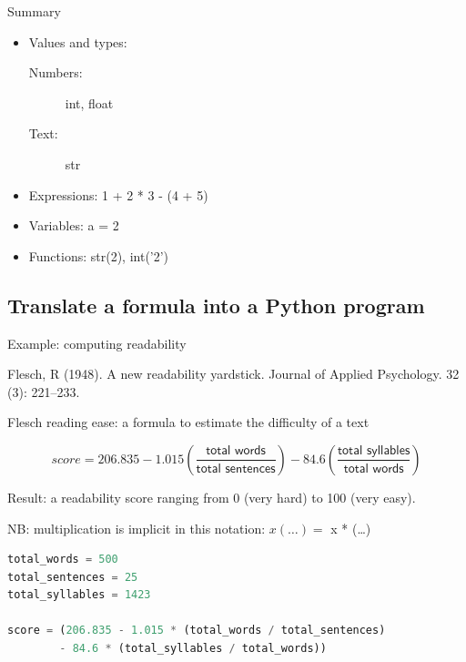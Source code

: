 \documentclass[aspectratio=169,usenames,dvipsnames]{beamer}
\begin{document}
\begin{frame}{Summary}
    \begin{itemize}
        \item Values and types:
            \begin{description}
                \item[Numbers:] int, float
                \item[Text:] str
            \end{description}
        \item Expressions: 1 + 2 * 3 - (4 + 5)
        \item Variables: a = 2
        \item Functions: str(2), int('2')
    \end{itemize}
\end{frame}


\subsection{Translate a formula into a Python program}
\begin{frame}{Example: computing readability}
	\begin{reference}
    Flesch, R (1948). A new readability yardstick.
		Journal of Applied Psychology. 32 (3): 221--233.
	\end{reference}

    Flesch reading ease: a formula to estimate the difficulty of a text

    \[
        score = 206.835 - 1.015 ( \frac{\textsf{total words}}{\textsf{total sentences}} )
            - 84.6 ( \frac{\textsf{total syllables}}{\textsf{total words}} )
    \]

    Result: a readability score ranging from 0 (very hard) to 100 (very easy).

    \pause
    \vspace{1em}
	NB: multiplication is implicit in this notation: $ x(\dots) = $ x * (\dots)
\end{frame}

\begin{frame}[fragile]
\begin{lstlisting}[language=python]
total_words = 500
total_sentences = 25
total_syllables = 1423

score = (206.835 - 1.015 * (total_words / total_sentences)
		- 84.6 * (total_syllables / total_words))
\end{lstlisting}
\end{frame}
\end{document}
